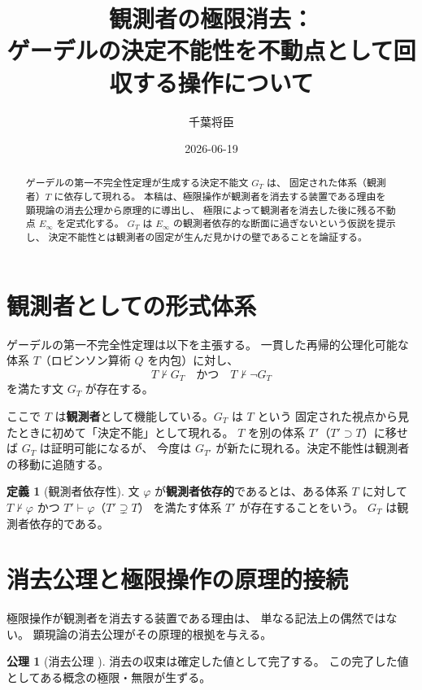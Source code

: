 \documentclass[11pt,a4paper]{article}
\title{観測者の極限消去：\\
ゲーデルの決定不能性を不動点として回収する操作について}
\author{千葉将臣}
\date{2026-06-19}
\theoremstyle{definition}
\newtheorem{definition}{定義}[section]
\newtheorem{axiom}{公理}[section]
\newcommand{\Einfty}{E_\infty}
\begin{document}
\maketitle

\begin{abstract}
ゲーデルの第一不完全性定理が生成する決定不能文 $G_T$ は、
固定された体系（観測者）$T$ に依存して現れる。
本稿は、極限操作が観測者を消去する装置である理由を
顕現論の消去公理から原理的に導出し、
極限によって観測者を消去した後に残る不動点 $\Einfty$ を定式化する。
$G_T$ は $\Einfty$ の観測者依存的な断面に過ぎないという仮説を提示し、
決定不能性とは観測者の固定が生んだ見かけの壁であることを論証する。
\end{abstract}

\section{観測者としての形式体系}

ゲーデルの第一不完全性定理は以下を主張する。
一貫した再帰的公理化可能な体系 $T$（ロビンソン算術 $Q$ を内包）に対し、
$$T \nvdash G_T \quad \text{かつ} \quad T \nvdash \neg G_T$$
を満たす文 $G_T$ が存在する。

ここで $T$ は\textbf{観測者}として機能している。$G_T$ は $T$ という
固定された視点から見たときに初めて「決定不能」として現れる。
$T$ を別の体系 $T'$（$T' \supset T$）に移せば $G_T$ は証明可能になるが、
今度は $G_{T'}$ が新たに現れる。決定不能性は観測者の移動に追随する。

\begin{definition}[観測者依存性]
文 $\varphi$ が\textbf{観測者依存的}であるとは、ある体系 $T$ に対して
$T \nvdash \varphi$ かつ $T' \vdash \varphi$（$T' \supsetneq T$）
を満たす体系 $T'$ が存在することをいう。
$G_T$ は観測者依存的である。
\end{definition}

\section{消去公理と極限操作の原理的接続}

極限操作が観測者を消去する装置である理由は、
単なる記法上の偶然ではない。
顕現論の消去公理がその原理的根拠を与える。

\begin{axiom}[消去公理 \cite{Chiba2026_chikaku} ]
消去の収束は確定した値として完了する。
この完了した値としてある概念の極限・無限が生ずる。
\end{axiom}
\end{document}
